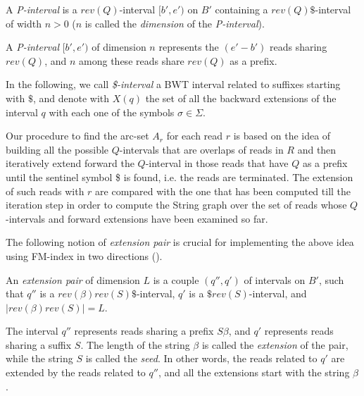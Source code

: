 \documentclass[runningheads,envcountsame,a4paper]{llncs}
\begin{document}
\begin{definition}
A \emph{P-interval} is a $rev(Q)$-interval $[b',e')$ on $B'$ containing a $rev(Q)\$$-interval of width $n>0$ ($n$ is called the \emph{dimension} of the \emph{P-interval}).
\end{definition}

A \emph{P-interval} $[b',e')$ of dimension $n$ represents the $(e'-b')$ reads sharing $rev(Q)$, and $n$ among these reads share $rev(Q)$ as a prefix.



In the following, we call \emph{\$-interval} a BWT interval related to suffixes starting with $\$$, and denote with $X(q)$ the set of all the backward extensions of the interval $q$ with each one of the symbols $\sigma \in \Sigma$.


Our  procedure to find the arc-set $A_r$ for each read $r$   is based on the idea of  building all the possible $Q$-intervals that are overlaps of reads in $R$ and then iteratively extend
forward the $Q$-interval in those reads that have $Q$ as a prefix until the sentinel symbol \$ is found, i.e. the reads are terminated. The extension of such reads with $r$ are compared with the one
that has been computed till the iteration step in order to compute  the String graph over the set of  reads whose $Q$-intervals and forward extensions have been examined so far.

The following notion of \emph{extension pair} is crucial for implementing the above idea using FM-index in two directions (\cite{Lam2009}).


\begin{definition}
\label{extension-pair}
An \emph{extension pair} of dimension $L$ is a couple $(q'', q')$ of intervals on $B'$, such that $q''$ is a $rev(\beta)rev(S)\$$-interval, $q'$ is a $\$rev(S)$-interval,
and $|rev(\beta)rev(S)| = L$.
\end{definition}

The interval $q''$ represents reads sharing a prefix $S\beta$, and $q'$ represents reads sharing a suffix $S$. The length of the string $\beta$ is called the \emph{extension} of the pair, while the string $S$ is called the \emph{seed}. In other words, the reads related to $q'$ are extended by the reads related to $q''$, and all the extensions start with the string $\beta$.
\end{document}
